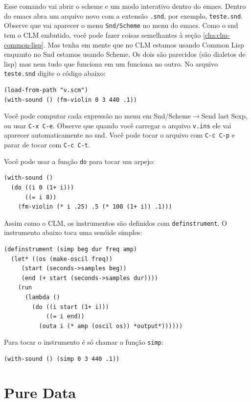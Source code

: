 \documentclass[12pt,brazil]{book}
\newcommand{\sep}{$\rightarrow$}
\begin{document}
Esse comando vai abrir o scheme e um modo interativo dentro do emacs.
Dentro do emacs abra um arquivo novo com a extensão \texttt{.snd}, por
exemplo, \texttt{teste.snd}. Observe que vai aparecer o menu
\texttt{Snd/Scheme} no menu do emacs. Como o snd tem o CLM embutido,
você pode fazer coisas semelhantes à seção \ref{cha:clm-common-lisp}.
Mas tenha em mente que no CLM estamos usando Common Lisp enquanto no
Snd estamos usando Scheme. Os dois são parecidos (são dialetos de
lisp) mas nem tudo que funciona em um funciona no outro. No arquivo
\texttt{teste.snd} digite o código abaixo:

\begin{verbatim}
(load-from-path "v.scm")
(with-sound () (fm-violin 0 3 440 .1))
\end{verbatim}

Você pode computar cada expressão no menu em Snd/Scheme\sep Send last
Sexp, ou usar \texttt{C-x C-e}. Observe que quando você carregar o
arquivo \texttt{v.ins} ele vai aparecer automaticamente no snd. Você
pode tocar o arquivo com \texttt{C-c C-p} e parar de tocar com
\texttt{C-c C-t}.

Você pode usar a função \texttt{do} para tocar um arpejo:

\begin{verbatim}
(with-sound ()
  (do ((i 0 (1+ i)))
      ((= i 8))
    (fm-violin (* i .25) .5 (* 100 (1+ i)) .1)))
\end{verbatim}

Assim como o CLM, os instrumentos são definidos com
\texttt{definstrument}. O instrumento abaixo toca uma senóide simples:

\begin{verbatim}
(definstrument (simp beg dur freq amp)
  (let* ((os (make-oscil freq))
	 (start (seconds->samples beg))
	 (end (+ start (seconds->samples dur))))
    (run
      (lambda ()
        (do ((i start (1+ i))) 
            ((= i end))
          (outa i (* amp (oscil os)) *output*))))))
\end{verbatim}

Para tocar o instrumento é só chamar a função \texttt{simp}:

\begin{verbatim}
(with-sound () (simp 0 3 440 .1))
\end{verbatim}

\chapter{Pure Data}
\label{cha:pure-data}
\end{document}
